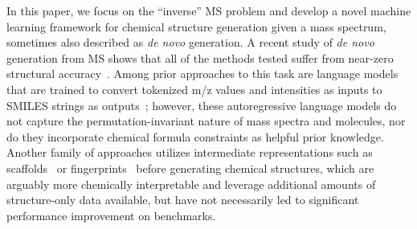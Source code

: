 \documentclass{article}
\theoremstyle{plain}
\theoremstyle{definition}
\theoremstyle{remark}
\begin{document}



In this paper, we focus on the ``inverse'' MS problem and develop a novel machine learning framework for chemical structure generation given a mass spectrum, sometimes also described as \emph{de novo} generation. 
A recent study of \emph{de novo} generation from MS shows that all of the methods tested suffer from near-zero structural accuracy~\citep{bushuiev2024massspecgymbenchmarkdiscoveryidentification}. 
Among prior approaches to this task are language models that are trained to convert tokenized m/z values and intensities as inputs to SMILES strings as outputs~\citep{butler2023ms2mol,litsa2023spec2mol}; however, these autoregressive language models do not capture the permutation-invariant nature of mass spectra and molecules, nor do they incorporate chemical formula constraints as helpful prior knowledge. 
Another family of approaches utilizes intermediate representations such as scaffolds~\citep{wang2025madgenmassspecattendsnovo} or fingerprints~\citep{stravs2022msnovelist} before generating chemical structures, which are arguably more chemically interpretable and leverage additional amounts of structure-only data available, %
but have not necessarily led to significant performance improvement on benchmarks.
\end{document}
